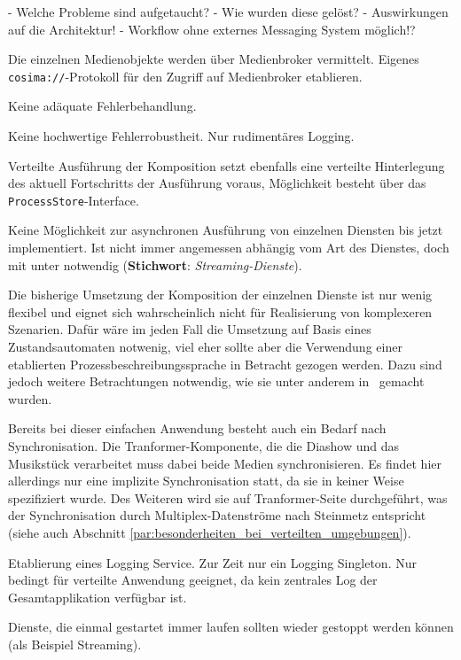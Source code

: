   - Welche Probleme sind aufgetaucht?
  - Wie wurden diese gelöst?
  - Auswirkungen auf die Architektur!
  - Workflow ohne externes Messaging System möglich!?
  
  Die einzelnen Medienobjekte werden über Medienbroker vermittelt. Eigenes \verb!cosima://!-Protokoll für den Zugriff auf Medienbroker etablieren.
    
  Keine adäquate Fehlerbehandlung.
  
  Keine hochwertige Fehlerrobustheit. Nur rudimentäres Logging.
  
  Verteilte Ausführung der Komposition setzt ebenfalls eine verteilte Hinterlegung des aktuell Fortschritts der Ausführung voraus, Möglichkeit besteht über das \verb!ProcessStore!-Interface.
  
  Keine Möglichkeit zur asynchronen Ausführung von einzelnen Diensten bis jetzt implementiert. Ist nicht immer angemessen abhängig vom Art des Dienstes, doch mit unter notwendig (\textbf{Stichwort}: \emph{Streaming-Dienste}).
  
  Die bisherige Umsetzung der Komposition der einzelnen Dienste ist nur wenig flexibel und eignet sich wahrscheinlich nicht für Realisierung von komplexeren Szenarien. Dafür wäre im jeden Fall die Umsetzung auf Basis eines Zustandsautomaten notwenig, viel eher sollte aber die Verwendung einer etablierten Prozessbeschreibungssprache in Betracht gezogen werden. Dazu sind jedoch weitere Betrachtungen notwendig, wie sie unter anderem in~\citep{samma08} gemacht wurden.

  Bereits bei dieser einfachen Anwendung besteht auch ein Bedarf nach Synchronisation. Die Tranformer-Komponente, die die Diashow und das Musikstück verarbeitet muss dabei beide Medien synchronisieren. Es findet hier allerdings nur eine implizite Synchronisation statt, da sie in keiner Weise spezifiziert wurde. Des Weiteren wird sie auf Tranformer-Seite durchgeführt, was der Synchronisation durch Multiplex-Datenströme nach Steinmetz entspricht~\citep[S. 609]{multimedia_technologie} (siehe auch Abschnitt \ref{par:besonderheiten_bei_verteilten_umgebungen}).
  
  Etablierung eines Logging Service. Zur Zeit nur ein Logging Singleton. Nur bedingt für verteilte Anwendung geeignet, da kein zentrales Log der Gesamtapplikation verfügbar ist.
  
  Dienste, die einmal gestartet immer laufen sollten wieder gestoppt werden können (als Beispiel Streaming).
  
